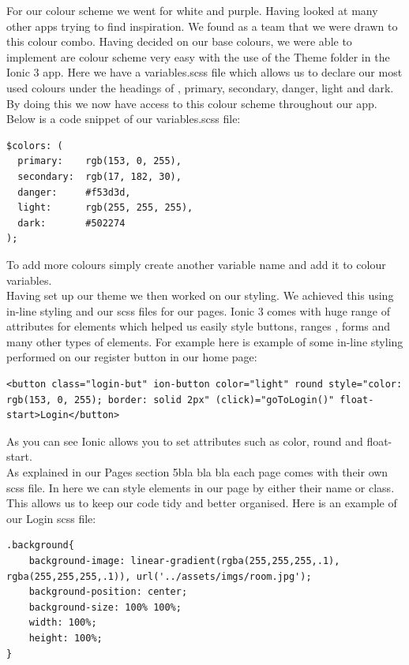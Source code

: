 \noindent For our colour scheme we went for white and purple. Having looked at many other apps trying to find inspiration. We found as a team that we were drawn to this colour combo. Having decided on our base colours, we were able to implement are colour scheme very easy with the use of the Theme folder in the Ionic 3 app. Here we have a variables.scss file which allows us to declare our most used colours under the headings of , primary, secondary, danger, light and dark. By doing this we now have access to this colour scheme throughout our app. Below is a code snippet of our variables.scss file:

\begin{verbatim}
$colors: (
  primary:    rgb(153, 0, 255),
  secondary:  rgb(17, 182, 30),
  danger:     #f53d3d,
  light:      rgb(255, 255, 255),
  dark:       #502274
);
\end{verbatim}

\noindent To add more colours simply create another variable name and add it to colour variables.\\

\noindent Having set up our theme we then worked on our styling. We achieved this using in-line styling and our scss files for our pages. Ionic 3 comes with huge range of attributes for elements which helped us easily style buttons, ranges , forms and many other types of elements. For example here is example of some in-line styling performed on our register button in our home page:

\begin{verbatim}
<button class="login-but" ion-button color="light" round style="color: rgb(153, 0, 255); border: solid 2px" (click)="goToLogin()" float-start>Login</button>
\end{verbatim}

As you can see Ionic allows you to set attributes such as color, round and float-start. \\

\noindent As explained in our Pages section 5bla bla bla each page comes with their own scss file. In here we can style elements in our page by either their name or class. This allows us to keep our code tidy and better organised. Here is an example of our Login scss file:

\begin{verbatim}
.background{
    background-image: linear-gradient(rgba(255,255,255,.1), rgba(255,255,255,.1)), url('../assets/imgs/room.jpg');
    background-position: center;
    background-size: 100% 100%;
    width: 100%;
    height: 100%;
}
\end{verbatim}

